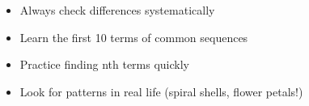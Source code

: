 \documentclass[a4paper,11pt]{article}
\begin{document}
\vspace{1cm}

\begin{tcolorbox}[colback=gray!10!white,colframe=gray!50!black,title=\textbf{Top Tips for 11+ Success}]
\begin{itemize}
    \item Always check differences systematically
    \item Learn the first 10 terms of common sequences
    \item Practice finding nth terms quickly
    \item Look for patterns in real life (spiral shells, flower petals!)
\end{itemize}
\end{tcolorbox}
\end{document}
